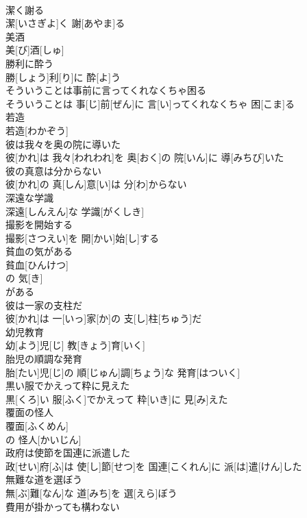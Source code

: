 \documentclass[8pt]{extreport}
\begin{document}
\begin{CJK}{UTF8}{min}
\\	潔く謝る	
\\	潔[いさぎよ]く 謝[あやま]る
\\	美酒	
\\	美[び]酒[しゅ]
\\	勝利に酔う	
\\	勝[しょう]利[り]に 酔[よ]う
\\	そういうことは事前に言ってくれなくちゃ困る	
\\	そういうことは 事[じ]前[ぜん]に 言[い]ってくれなくちゃ 困[こま]る
\\	若造	
\\	若造[わかぞう]
\\	彼は我々を奥の院に導いた	
\\	彼[かれ]は 我々[われわれ]を 奥[おく]の 院[いん]に 導[みちび]いた
\\	彼の真意は分からない	
\\	彼[かれ]の 真[しん]意[い]は 分[わ]からない
\\	深遠な学識	
\\	深遠[しんえん]な 学識[がくしき]
\\	撮影を開始する	
\\	撮影[さつえい]を 開[かい]始[し]する
\\	貧血の気がある	
\\	貧血[ひんけつ]
\\	の 気[き]
\\	がある 
\\	彼は一家の支柱だ	
\\	彼[かれ]は 一[いっ]家[か]の 支[し]柱[ちゅう]だ
\\	幼児教育	
\\	幼[よう]児[じ] 教[きょう]育[いく]
\\	胎児の順調な発育	
\\	胎[たい]児[じ]の 順[じゅん]調[ちょう]な 発育[はついく]
\\	黒い服でかえって粋に見えた	
\\	黒[くろ]い 服[ふく]でかえって 粋[いき]に 見[み]えた
\\	覆面の怪人	
\\	覆面[ふくめん]
\\	の 怪人[かいじん]
\\	政府は使節を国連に派遣した	
\\	政[せい]府[ふ]は 使[し]節[せつ]を 国連[こくれん]に 派[は]遣[けん]した
\\	無難な道を選ぼう	
\\	無[ぶ]難[なん]な 道[みち]を 選[えら]ぼう
\\	費用が掛かっても構わない	

\end{CJK}
\end{document}
